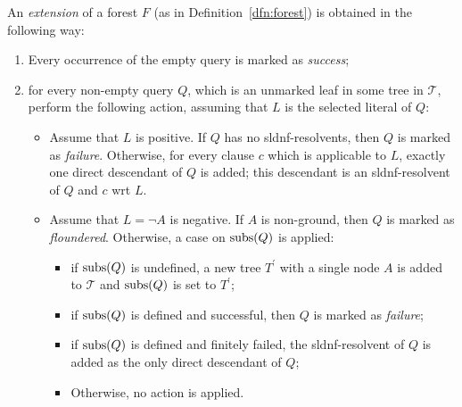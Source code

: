 \begin{dfn}[Extensions]
    An \emph{extension} of a forest \(F\) (as in Definition~\ref{dfn:forest}) is obtained in the following way:
    \begin{enumerate}
        \item Every occurrence of the empty query is marked as \emph{success};
        \item for every non-empty query \(Q\), which is an unmarked leaf in some tree in \(\mathcal{T}\), perform the following action, assuming that \(L\) is the selected literal of \(Q\):
        \begin{itemize}
            \item Assume that \(L\) is positive.
            If \(Q\) has no \gls{sldnf}-resolvents, then \(Q\) is marked as \emph{failure}.
            Otherwise, for every clause \(c\) which is applicable to \(L\), exactly one direct descendant of \(Q\) is added; this descendant is an \gls{sldnf}-resolvent of \(Q\) and \(c\) wrt \(L\).
            \item Assume that \(L = \neg A\) is negative.
            If \(A\) is non-ground, then \(Q\) is marked as \emph{floundered}.
            Otherwise, a case on \(\operatorname{subs}(Q)\) is applied:
            \begin{itemize}
                \item if \(\operatorname{subs}(Q)\) is undefined, a new tree \(T^\prime\) with a single node \(A\) is added to \(\mathcal{T}\) and \(\operatorname{subs}(Q)\) is set to \(T^\prime\);
                \item if \(\operatorname{subs}(Q)\) is defined and successful, then \(Q\) is marked as \emph{failure};
                \item if \(\operatorname{subs}(Q)\) is defined and finitely failed, the \gls{sldnf}-resolvent of \(Q\) is added as the only direct descendant of \(Q\);
                \item Otherwise, no action is applied.
            \end{itemize} 
        \end{itemize}
    \end{enumerate}
\end{dfn}

